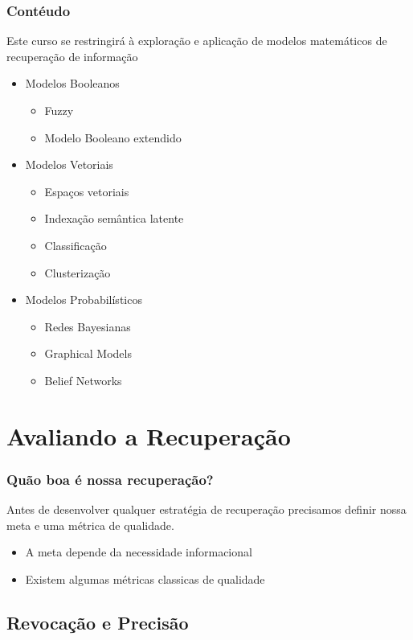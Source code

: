 \documentclass[compress]{beamer}
\begin{document}
\begin{frame}[fragile]
\frametitle{Contéudo}
Este curso se restringirá à exploração e aplicação de modelos matemáticos de recuperação de informação
\begin{itemize}[<+->]
 \item Modelos Booleanos
  \begin{itemize}
    \item Fuzzy
    \item Modelo Booleano extendido
  \end{itemize}
 \item Modelos Vetoriais
  \begin{itemize}
    \item Espaços vetoriais
    \item Indexação semântica latente
    \item Classificação
    \item Clusterização
  \end{itemize}
 \item Modelos Probabilísticos
  \begin{itemize}
    \item Redes Bayesianas
    \item Graphical Models
    \item Belief Networks
  \end{itemize}
\end{itemize}
\end{frame}

\section{Avaliando a Recuperação}
\begin{frame}[fragile]
\frametitle{Quão boa é nossa recuperação?}
Antes de desenvolver qualquer estratégia de recuperação precisamos definir nossa meta e uma métrica de qualidade.
\begin{itemize}[<+->]
 \item A meta depende da necessidade informacional
 \item Existem algumas métricas classicas de qualidade
\end{itemize}
\end{frame}

\subsection{Revocação e Precisão}
\end{document}

